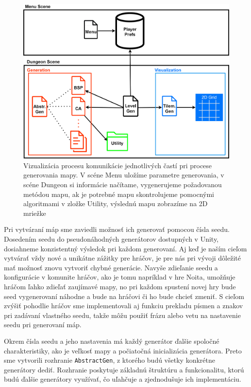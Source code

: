\begin{figure}[H]
    \centering
    \includegraphics[width=0.8\linewidth]{obrazky-figures/scenes.png}
    \caption{Vizualizácia procesu komunikácie jednotlivých častí pri procese generovania mapy. V scéne Menu uložíme parametre generovania, v scéne Dungeon si informácie načítame, vygenerujeme požadovanou metódou mapu, ak je potrebné mapu skontrolujeme pomocnými algoritmami v zložke Utility, výslednú mapu zobrazíme na 2D mriežke}
    \label{fig:scenes}
\end{figure}

Pri vytváraní máp sme zaviedli možnosť ich generovať pomocou čísla seedu. Dosedením seedu do pseudonáhodných generátorov dostupných v Unity, dosiahneme konzistentný výsledok pri každom generovaní. Aj keď je naším cieľom vytvárať vždy nové a unikátne zážitky pre hráčov, je pre nás pri vývoji dôležité mať možnosť znovu vytvoriť chybné generácie. Navyše zdieľanie seedu a konfigurácie v komunite hráčov, ako je tomu napríklad v hre Noita, umožňuje hráčom ľahko zdieľať zaujímavé mapy, no pri každom spustení novej hry bude seed vygenerovaní náhodne a bude na hráčovi či ho bude chcieť zmeniť. S cieľom zvýšiť pohodlie hráčov sme implementovali aj funkciu prekladu písmen a znakov pri zadávaní vlastného seedu, takže môžu použiť frázu alebo vetu na nastavenie seedu pri generovaní máp.

Okrem čísla seedu a jeho nastavenia má každý generátor ďalšie spoločné charakteristiky, ako je veľkosť mapy a počiatočná inicializácia generátora. Preto sme vytvorili rozhranie \verb|AbstractGen|, z ktorého budú všetky konkrétne generátory dediť. Rozhranie poskytuje základnú štruktúru a funkcionalitu, ktorú budú ďalšie generátory využívať, čo uľahčuje a zjednodušuje ich implementáciu.

